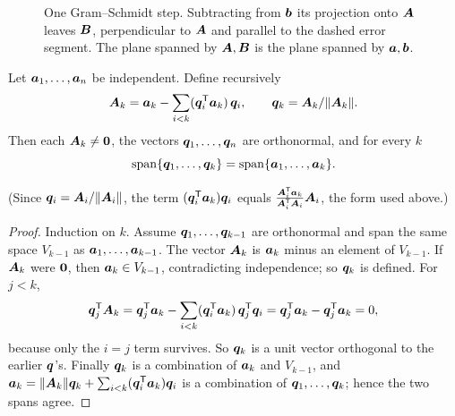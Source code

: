 \begin{figure}[ht]
  \centering
  \caption{One Gram--Schmidt step. Subtracting from $\boldsymbol{b}$ its projection onto $\boldsymbol{A}$
  leaves $\boldsymbol{B}$, perpendicular to $\boldsymbol{A}$ and parallel to the dashed error segment. The
  plane spanned by $\boldsymbol{A},\boldsymbol{B}$ is the plane spanned by $\boldsymbol{a},\boldsymbol{b}$.}
  \label{fig:u19-gs}
\end{figure}

\begin{theorem}\label{thm:u19-gs}
Let $\boldsymbol{a}_1,\dots,\boldsymbol{a}_n$ be independent. Define recursively
\[
  \boldsymbol{A}_k=\boldsymbol{a}_k-\sum_{i<k}(\boldsymbol{q}_i^{\mathsf{T}}\boldsymbol{a}_k)\,\boldsymbol{q}_i,\qquad
  \boldsymbol{q}_k=\boldsymbol{A}_k/\|\boldsymbol{A}_k\|.
\]
Then each $\boldsymbol{A}_k\neq\boldsymbol{0}$, the vectors $\boldsymbol{q}_1,\dots,\boldsymbol{q}_n$ are orthonormal, and for
every $k$
\[
  \operatorname{span}\{\boldsymbol{q}_1,\dots,\boldsymbol{q}_k\}=\operatorname{span}\{\boldsymbol{a}_1,\dots,\boldsymbol{a}_k\}.
\]
\end{theorem}

(Since $\boldsymbol{q}_i=\boldsymbol{A}_i/\|\boldsymbol{A}_i\|$, the term $(\boldsymbol{q}_i^{\mathsf{T}}\boldsymbol{a}_k)\boldsymbol{q}_i$ equals
$\frac{\boldsymbol{A}_i^{\mathsf{T}}\boldsymbol{a}_k}{\boldsymbol{A}_i^{\mathsf{T}}\boldsymbol{A}_i}\boldsymbol{A}_i$, the form used above.)

\begin{proof}
Induction on $k$. Assume $\boldsymbol{q}_1,\dots,\boldsymbol{q}_{k-1}$ are orthonormal and span the same
space $V_{k-1}$ as $\boldsymbol{a}_1,\dots,\boldsymbol{a}_{k-1}$. The vector $\boldsymbol{A}_k$ is $\boldsymbol{a}_k$ minus an
element of $V_{k-1}$. If $\boldsymbol{A}_k$ were $\boldsymbol{0}$, then $\boldsymbol{a}_k\in V_{k-1}$, contradicting
independence; so $\boldsymbol{q}_k$ is defined. For $j<k$,
\[
  \boldsymbol{q}_j^{\mathsf{T}}\boldsymbol{A}_k=\boldsymbol{q}_j^{\mathsf{T}}\boldsymbol{a}_k-\sum_{i<k}(\boldsymbol{q}_i^{\mathsf{T}}\boldsymbol{a}_k)\,\boldsymbol{q}_j^{\mathsf{T}}\boldsymbol{q}_i
  =\boldsymbol{q}_j^{\mathsf{T}}\boldsymbol{a}_k-\boldsymbol{q}_j^{\mathsf{T}}\boldsymbol{a}_k=0,
\]
because only the $i=j$ term survives. So $\boldsymbol{q}_k$ is a unit vector orthogonal to the
earlier $\boldsymbol{q}$'s. Finally $\boldsymbol{q}_k$ is a combination of $\boldsymbol{a}_k$ and $V_{k-1}$, and
$\boldsymbol{a}_k=\|\boldsymbol{A}_k\|\boldsymbol{q}_k+\sum_{i<k}(\boldsymbol{q}_i^{\mathsf{T}}\boldsymbol{a}_k)\boldsymbol{q}_i$ is a combination of
$\boldsymbol{q}_1,\dots,\boldsymbol{q}_k$; hence the two spans agree.
\end{proof}

